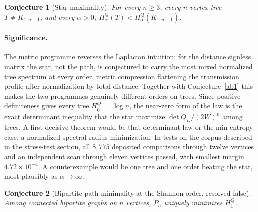 \documentclass[11pt]{article}
\newtheorem{conjecture}{Conjecture}
\theoremstyle{definition}
\begin{document}
\begin{conjecture}[Star maximality]\label{ab8}
For every $n\ge3$, every $n$-vertex tree $T\ne K_{1,n-1}$, and every $\alpha>0$, $H^Q_\alpha(T)<H^Q_\alpha(K_{1,n-1})$.
\end{conjecture}

\paragraph{Significance.}
The metric programme reverses the Laplacian intuition: for the distance signless matrix the star, not the path, is conjectured to carry the most mixed normalized tree spectrum at every order, metric compression flattening the transmission profile after normalization by total distance.  Together with Conjecture~\ref{ab1} this makes the two programmes genuinely different orders on trees.  Since positive definiteness gives every tree $H^Q_{0^+}=\log n$, the near-zero form of the law is the exact determinant inequality that the star maximize $\det Q_D/(2W)^n$ among trees.  A first decisive theorem would be that determinant law or the min-entropy case, a normalized spectral-radius minimization.  In tests on the corpus described in the stress-test section, all $8{,}775$ deposited comparisons through twelve vertices and an independent scan through eleven vertices passed, with smallest margin $4.72\times10^{-4}$.  A counterexample would be one tree and one order beating the star, most plausibly as $\alpha\to\infty$.

\begin{conjecture}[Bipartite path minimality at the Shannon order, resolved false]\label{ab9}
Among connected bipartite graphs on $n$ vertices, $P_n$ uniquely minimizes $H^Q_1$.
\end{conjecture}
\end{document}
